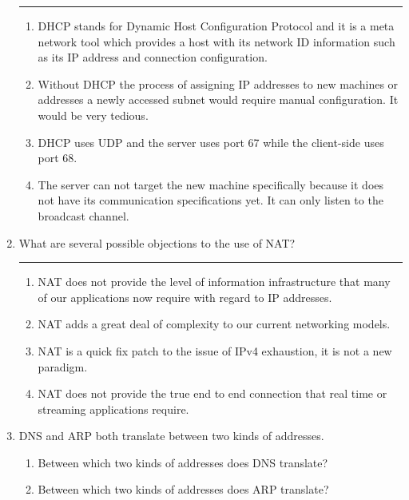 \documentclass[twoside]{article}
\newenvironment{answer}
  {\vspace*{0.2cm} \rule{12cm}{0.04cm} \vspace*{0.2cm}}
  {\vspace*{0.2cm}}
\begin{document}
\begin{enumerate}
\begin{answer}
  \begin{enumerate}
    \item DHCP stands for Dynamic Host Configuration Protocol and it is a meta network tool which provides a host with its network ID information such as its IP address and connection configuration.
    \item Without DHCP the process of assigning IP addresses to new machines or addresses a newly accessed subnet would require manual configuration.  It would be very tedious.
    \item DHCP uses UDP and the server uses port 67 while the client-side uses port 68.
    \item The server can not target the new machine specifically because it does not have its communication specifications yet.  It can only listen to the broadcast channel.
    \end{enumerate}

    \end{answer}

  \item What are several possible objections to the use of NAT?

  \begin{answer}

  \begin{enumerate}
    \item NAT does not provide the level of information infrastructure that many of our applications now require with regard to IP addresses.
    \item NAT adds a great deal of complexity to our current networking models.
    \item NAT is a quick fix patch to the issue of IPv4 exhaustion, it is not a new paradigm.
    \item NAT does not provide the true end to end connection that real time or streaming applications require.
    \end{enumerate}

    \end{answer}

  \item DNS and ARP both translate between two kinds of addresses.
  \begin{enumerate}
    \item Between which two kinds of addresses does DNS translate?
    \item Between which two kinds of addresses does ARP translate?
    \end{enumerate}


\end{enumerate}
\end{document}
